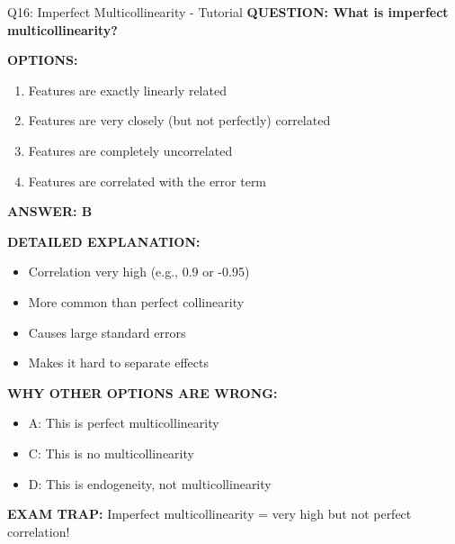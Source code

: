 \documentclass[8pt]{beamer}
\begin{document}
	\begin{frame}{Q16: Imperfect Multicollinearity - Tutorial}
		\fontsize{6.5}{7.5}\selectfont
		\textbf{QUESTION: What is imperfect multicollinearity?}
		
		\vspace{0.1cm}
		\textbf{OPTIONS:}
		\begin{enumerate}
			\item Features are exactly linearly related
			\item Features are very closely (but not perfectly) correlated
			\item Features are completely uncorrelated
			\item Features are correlated with the error term
		\end{enumerate}
		
		\vspace{0.1cm}
		\textcolor{myblue}{\textbf{ANSWER: B}}
		
		\vspace{0.1cm}
		\textbf{DETAILED EXPLANATION:}
		\begin{itemize}
			\item Correlation very high (e.g., 0.9 or -0.95)
			\item More common than perfect collinearity
			\item Causes large standard errors
			\item Makes it hard to separate effects
		\end{itemize}
		
		\vspace{0.1cm}
		\textcolor{myred}{\textbf{WHY OTHER OPTIONS ARE WRONG:}}
		\begin{itemize}
			\item \textcolor{myred}{A:} This is perfect multicollinearity
			\item \textcolor{myred}{C:} This is no multicollinearity
			\item \textcolor{myred}{D:} This is endogeneity, not multicollinearity
		\end{itemize}
		
		\textcolor{myred}{\textbf{EXAM TRAP:}} Imperfect multicollinearity = \textcolor{myblue}{very high but not perfect correlation}!
	\end{frame}
	
\end{document}
